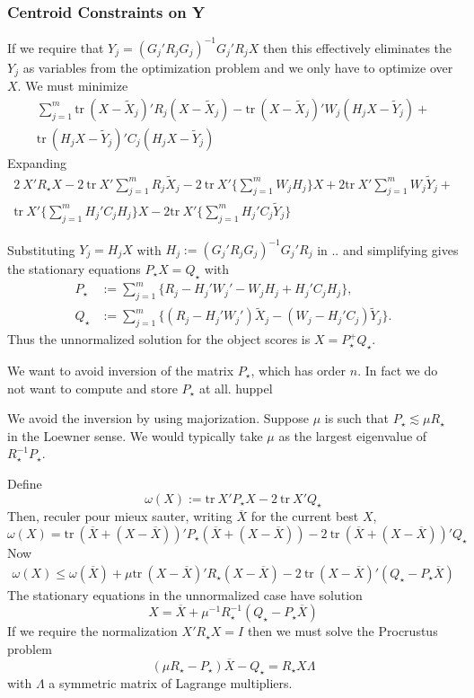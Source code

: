 \documentclass[
  12pt,
  letterpaper,
  DIV=11,
  numbers=noendperiod]{scrartcl}
\begin{document}
\subsubsection{Centroid Constraints on
Y}\label{centroid-constraints-on-y}

If we require that \(Y_j=(G_j'R_jG_j)^{-1}G_j'R_jX\) then this
effectively eliminates the \(Y_j\) as variables from the optimization
problem and we only have to optimize over \(X\). We must minimize
\begin{multline}
\sum_{j=1}^m\text{tr}\ (X-\tilde X_j)'R_j(X-\tilde X_j) -
\text{tr}\ (X-\tilde X_j)'W_j(H_jX-\tilde Y_j)+\\
\text{tr}\ (H_jX-\tilde Y_j)'C_j(H_jX-\tilde Y_j)
\end{multline} Expanding \begin{multline}
2\ X'R_\star X-2\ \text{tr}\ X'\sum_{j=1}^mR_j\tilde X_j-2\ \text{tr}\ X'\{\sum_{j=1}^mW_jH_j\}X + 2\text{tr}\ X'\sum_{j=1}^mW_j\tilde Y_j+\\
\text{tr}\ X'\{\sum_{j=1}^mH_j'C_jH_j\}X-2\text{tr}\ X'\{\sum_{j=1}^mH_j'C_j\tilde Y_j\}
\end{multline}

Substituting \(Y_j=H_jX\) with \(H_j:=(G_j'R_jG_j)^{-1}G_j'R_j\) in ..
and simplifying gives the stationary equations \(P_\star X= Q_\star\)
with \begin{subequations}
\begin{align}
P_\star&:=\sum_{j=1}^m\{R_j-H_j'W_j'-W_jH_j+H_j'C_jH_j\},\\
Q_\star&:=\sum_{j=1}^m\{(R_j-H_j'W_j')\tilde X_j-(W_j-H_j'C_j)\tilde Y_j\}.
\end{align}
\end{subequations} Thus the unnormalized solution for the object scores
is \(X=P^+_\star Q_\star\).

We want to avoid inversion of the matrix \(P_\star\), which has order
\(n\). In fact we do not want to compute and store \(P_\star\) at all.
huppel

We avoid the inversion by using majorization. Suppose \(\mu\) is such
that \(P_\star\lesssim\mu R_\star\) in the Loewner sense. We would
typically take \(\mu\) as the largest eigenvalue of
\(R_\star^{-1}P_\star\).

Define \[
\omega(X):=\text{tr}\ X'P_\star X-2\ \text{tr}\ X'Q_\star
\] Then, reculer pour mieux sauter, writing \(\overline{X}\) for the
current best \(X\), \[
\omega(X)=\text{tr}\ (\overline X+(X-\overline X))'P_\star(\overline X+(X-\overline X))-2\ \text{tr}\ (\overline X+(X-\overline X))'Q_\star
\] Now \begin{multline}
\omega(X)\leq\omega(\overline X)+
\mu\text{tr}\ (X-\overline X)'R_\star(X-\overline X)-2\ \text{tr}\ (X-\overline X)'(Q_\star-P_\star\overline X)
\end{multline} The stationary equations in the unnormalized case have
solution \[
X=\overline X+\mu^{-1}R_\star^{-1}(Q_\star-P_\star\overline X)
\] If we require the normalization \(X'R_\star X=I\) then we must solve
the Procrustus problem \[
(\mu R_\star-P_\star)\overline X - Q_\star=R_\star X\Lambda
\] with \(\Lambda\) a symmetric matrix of Lagrange multipliers.
\end{document}
